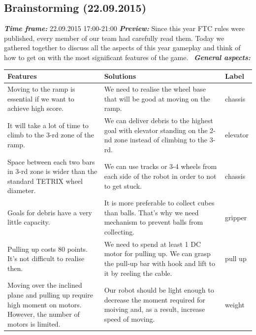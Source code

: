 \subsection{Brainstorming (22.09.2015)}
	\textit{\textbf{Time frame:}} 22.09.2015 17:00-21:00 \newline
	\textit{\textbf{Preview:}} Since this year FTC rules were published, every member of our team had carefully read them. Today we gathered together to discuss all the aspects of this year gameplay and think of how to get on with the most significant features of the game. \newline \newline
	\textit{\textbf{General aspects:}}
	\begin{table}[H]
		\vspace{-2mm}
		\begin{center}
			\begin{tabular}{|p{0.4\linewidth}|p{0.5\linewidth}|p{0.1\linewidth}|}
				\hline
				Features & Solutions & Label \\
				\hline
				Moving to the ramp is essential if we want to achieve high score. & We need to realise the wheel base that will be good at moving on the ramp. & chassis \\
				\hline
				It will take a lot of time to climb to the 3-rd zone of the ramp. & We can deliver debris to the highest goal with elevator standing on the 2-nd zone instead of climbing to the 3-rd. & elevator \\
				\hline
				Space between each two bars in 3-rd zone is wider than the standard TETRIX wheel diameter. & We can use tracks or 3-4 wheels from each side of the robot in order to not to get stuck. & chassis \\
				\hline
				Goals for debris have a very little capacity. & It is more preferable to collect cubes than balls. That's why we need mechanism to prevent balls from collecting. & gripper \\
				\hline
				Pulling up costs 80 points. It's not difficult to realise then. & We need to spend at least 1 DC motor for pulling up. We can grasp the pull-up bar with hook and lift to it by reeling the cable. & pull up \\
				\hline
				Moving over the inclined plane and pulling up require high moment on motors. However, the number of motors is limited. & Our robot should be light enough to decrease the moment required for moiving and, as a result, increase speed of moving. & weight \\
				\hline

\end{tabular}
\end{center}
\end{table}
